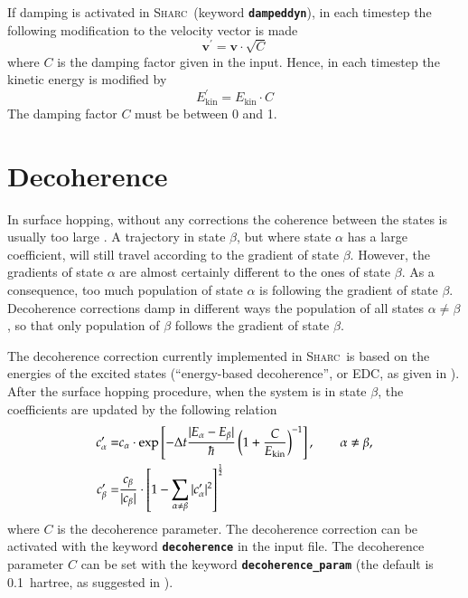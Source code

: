 \documentclass[a4paper,11pt,DIV=15,openany,twoside=false]{scrbook}
\newcommand{\sharc}{\textsc{Sharc}}
\newcommand{\ttt}[1]{\textbf{\texttt{#1}}}
\newcommand{\VEC}[1]{\ensuremath{\mathbf{#1}}}
\begin{document}
If damping is activated in \sharc\ (keyword \ttt{dampeddyn}), in each timestep the following modification to the velocity vector is made
\begin{equation}
  \VEC{v}^\prime=\VEC{v}\cdot\sqrt{C}
\end{equation}
where $C$ is the damping factor given in the input. Hence, in each timestep the kinetic energy is modified by
\begin{equation}
  E_{\text{kin}}^\prime=E_{\text{kin}}\cdot C
\end{equation}
The damping factor $C$ must be between 0 and 1.


\section{Decoherence}\label{met:decoherence}

In surface hopping, without any corrections the coherence between the states is usually too large \cite{Granucci2007JCP}. A trajectory in state $\beta$, but where state $\alpha$ has a large coefficient, will still travel according to the gradient of state $\beta$. However, the gradients of state $\alpha$ are almost certainly different to the ones of state $\beta$. As a consequence, too much population of state $\alpha$ is following the gradient of state $\beta$. Decoherence corrections damp in different ways the population of all states $\alpha\neq\beta$, so that only population of $\beta$ follows the gradient of state $\beta$.

The decoherence correction currently implemented in \sharc\ is based on the energies of the excited states (``energy-based decoherence'', or EDC, as given in \cite{Granucci2010JCP}). After the surface hopping procedure, when the system is in state $\beta$, the coefficients are updated by the following relation
\begin{align}
  c_\alpha^\prime=&
  c_\alpha\cdot\exp
  \left[
    -\Delta t\frac{|E_\alpha-E_\beta|}{\hbar}
    \left(
      1+\frac{C}{E_{\text{kin}}}
    \right)^{-1}
  \right],\qquad \alpha\neq\beta,\\
  c_\beta^\prime=&
  \frac{c_\beta}{|c_\beta|}\cdot
  \left[
    1-\sum\limits_{\alpha\neq\beta}^{\vphantom{\alpha}} |c^\prime_\alpha|^2
  \right]^{\frac{1}{2}}
\end{align}
where $C$ is the decoherence parameter. The decoherence correction can be activated with the keyword \ttt{decoherence} in the input file. The decoherence parameter $C$ can be set with the keyword \ttt{decoherence\_param} (the default is 0.1~hartree, as suggested in \cite{Granucci2010JCP}).
\end{document}
